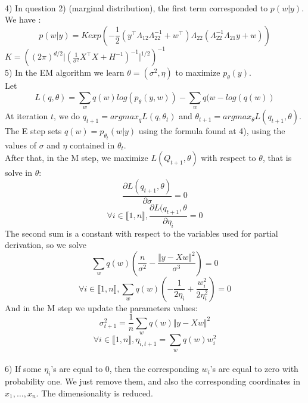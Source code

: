 \documentclass[11pt,a4paper]{article}
\begin{document}
%
%
\\[5mm]4) In question 2) (marginal distribution), the first term corresponded to $p(w\vert y)$. We have :
$$ p(w\vert y) = K exp \left( - \frac{1}{2} ( y^{\top} \Lambda_{12} \Lambda_{22}^{-1} + w^{\top})\Lambda_{22}(\Lambda_{22}^{-1}\Lambda_{21}y + w ) \right)$$
%
$K = \left( (2\pi)^{d/2} \vert ( \frac{1}{\sigma^2} X^{\top}X + H^{-1})^{-1}\vert^{1/2} \right) ^{-1}$
%
%
\\[5mm]5) In the EM algorithm we learn $\theta = (\sigma^2, \eta)$ to maximize $p_\theta(y)$.
\\Let $$L(q, \theta) = \sum_w q(w) log(p_\theta(y, w)) - \sum_w q(w- log(q(w))$$
At iteration $t$, we do $q_{t+1} = argmax_q L(q, \theta_t)$ and $\theta_{t+1} = argmax_\theta L(q_{t+1}, \theta)$.
%
\\[5mm]The E step sets $q(w) = p_{\theta_t} (w \vert y)$ using the formula found at 4), using the values of $\sigma$ and $\eta$ contained in $\theta_t$.
\\After that, in the M step, we maximize $L(Q_{t+1}, \theta)$ with respect to $\theta$, that is solve in $\theta$:
$$ \frac{\partial L(q_{t+1}, \theta)}{\partial \sigma} = 0$$
$$ \forall i \in \llbracket 1 , n \rrbracket,  \frac{\partial L(q_{t+1}, \theta}{\partial \eta_i} = 0 $$
%
The second sum is a constant with respect to the variables used for partial derivation, so we solve 
$$\sum_w q(w) \left( \frac{n}{\sigma^2} - \frac{\Vert y - X w \Vert ^2}{\sigma^3} \right)= 0$$
$$ \forall i \in \llbracket 1 , n \rrbracket,  \sum_w q(w) \left( - \frac{1}{2 \eta_i} + \frac{w_i^2}{2 \eta_i^2} \right) = 0$$
%
And in the M step we update the parameters values:
$$\sigma^2_{t+1} = \frac{1}{n} \sum_w q(w) \Vert y - Xw \Vert ^2$$
$$ \forall i \in \llbracket 1 , n \rrbracket,  \eta_{i, t+1} = \sum_w q(w) w_i^2$$
%
%
\\[5mm]6) If some $\eta_i$'s are equal to 0, then the corresponding $w_i$'s are equal to zero with probability one. We just remove them, and also the corresponding coordinates in $x_1, \ldots, x_n$. The dimensionality is reduced.
\end{document}
